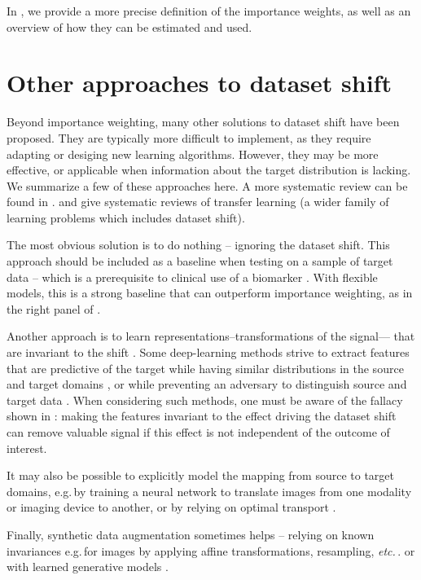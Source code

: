 \documentclass[a4paper,num-refs]{oup-contemporary}
\newcommand{\eg}{e.g.\,}
\newcommand{\etc}{\emph{etc.}\,}
\begin{document}
In , we provide a more precise definition of
the importance weights, as well as an overview of how they can be estimated and
used.

\section{Other approaches to dataset shift}
Beyond importance weighting, many other solutions to dataset shift have been proposed.
%
They are typically more difficult to implement, as they require adapting or desiging new learning algorithms.
However, they may be more effective, or applicable when information about the target distribution is lacking.
We summarize a few of these approaches here.
A more systematic review can be found in \citet{kouw2019review}.
 and \citet{pan2009survey} give systematic reviews of transfer learning (a wider family of learning problems which includes dataset shift).
%

The most obvious solution is to do nothing -- ignoring the dataset shift.
This approach should be included as a baseline when testing on a sample of target data -- which is a prerequisite to clinical use of a biomarker \citep{storkey2009training,woo2017building}.
With flexible models, this is a strong baseline that can outperform
importance weighting, as in the right panel of .
%

%
Another approach is to learn representations--transformations of the
signal--- that are invariant to the shift \citep{achille2018emergence}.
Some deep-learning methods strive to extract features that are predictive
of the target while having similar distributions in the source and target
domains \citep[\eg][]{long2015learning}, or while preventing an adversary to distinguish source and target data \citep[``domain-adversarial'' learning, \eg][]{tzeng2017adversarial}.
When considering such methods, one must be aware of the fallacy shown in
: making the features invariant to the effect driving the dataset shift can
remove valuable signal if this effect is not independent of the outcome
of interest.

It may also be possible to explicitly model the mapping from source to target domains, \eg by training a neural network to translate images from one modality or imaging device to another, or by relying on optimal transport \citep{courty2016optimal}.

Finally, synthetic data augmentation sometimes helps -- relying on known invariances \eg for images by applying affine transformations, resampling, \etc. or with learned generative models \citep[e.g.][]{antoniou2017data}.
\end{document}
